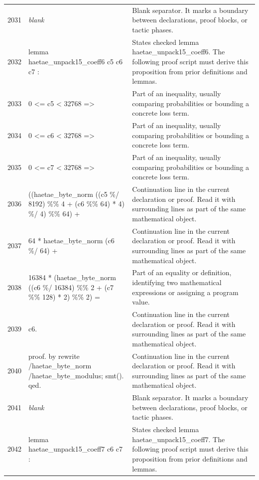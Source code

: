 \documentclass[10pt]{article}
\begin{document}
\begin{longtable}{r L{0.53\textwidth} L{0.37\textwidth}}
2031 & {\ttfamily\scriptsize \emph{blank}} & Blank separator.  It marks a boundary between declarations, proof blocks, or tactic phases. \\
2032 & {\ttfamily\scriptsize lemma haetae\_unpack15\_coeff6 c5 c6 c7 :} & States checked lemma haetae\_unpack15\_coeff6.  The following proof script must derive this proposition from prior definitions and lemmas. \\
2033 & {\ttfamily\scriptsize   0 <= c5 < 32768 =>} & Part of an inequality, usually comparing probabilities or bounding a concrete loss term. \\
2034 & {\ttfamily\scriptsize   0 <= c6 < 32768 =>} & Part of an inequality, usually comparing probabilities or bounding a concrete loss term. \\
2035 & {\ttfamily\scriptsize   0 <= c7 < 32768 =>} & Part of an inequality, usually comparing probabilities or bounding a concrete loss term. \\
2036 & {\ttfamily\scriptsize   ((haetae\_byte\_norm ((c5 \%/ 8192) \%\% 4 + (c6 \%\% 64) * 4) \%/ 4) \%\% 64) +} & Continuation line in the current declaration or proof.  Read it with surrounding lines as part of the same mathematical object. \\
2037 & {\ttfamily\scriptsize     64 * haetae\_byte\_norm (c6 \%/ 64) +} & Continuation line in the current declaration or proof.  Read it with surrounding lines as part of the same mathematical object. \\
2038 & {\ttfamily\scriptsize     16384 * (haetae\_byte\_norm ((c6 \%/ 16384) \%\% 2 + (c7 \%\% 128) * 2) \%\% 2) =} & Part of an equality or definition, identifying two mathematical expressions or assigning a program value. \\
2039 & {\ttfamily\scriptsize   c6.} & Continuation line in the current declaration or proof.  Read it with surrounding lines as part of the same mathematical object. \\
2040 & {\ttfamily\scriptsize proof. by rewrite /haetae\_byte\_norm /haetae\_byte\_modulus; smt(). qed.} & Continuation line in the current declaration or proof.  Read it with surrounding lines as part of the same mathematical object. \\
2041 & {\ttfamily\scriptsize \emph{blank}} & Blank separator.  It marks a boundary between declarations, proof blocks, or tactic phases. \\
2042 & {\ttfamily\scriptsize lemma haetae\_unpack15\_coeff7 c6 c7 :} & States checked lemma haetae\_unpack15\_coeff7.  The following proof script must derive this proposition from prior definitions and lemmas. \\

\end{longtable}
\end{document}
